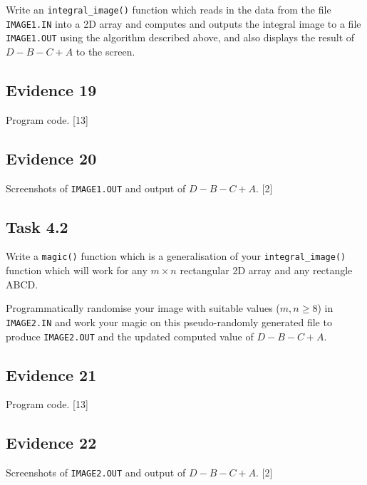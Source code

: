 Write an \texttt{integral\_image()} function which reads in the data
from the file \texttt{IMAGE1.IN} into a 2D array and computes and
outputs the integral image to a file \texttt{IMAGE1.OUT} using the
algorithm described above, and also displays the result of $D-B-C+A$
to the screen. 

\subsection*{Evidence 19}

Program code. \hfill{} {[}13{]}

\subsection*{Evidence 20}

Screenshots of \texttt{IMAGE1.OUT} and output of $D-B-C+A$. \hfill{}{[}2{]}

\subsection*{Task 4.2}

Write a \texttt{magic()} function which is a generalisation of your
\texttt{integral\_image()} function which will work for any $m\times n$
rectangular 2D array and any rectangle ABCD.

Programmatically randomise your image with suitable values ($m,n\geq8$)
in \texttt{IMAGE2.IN} and work your magic on this pseudo-randomly
generated file to produce \texttt{IMAGE2.OUT} and the updated computed
value of $D-B-C+A$. 

\subsection*{Evidence 21}

Program code. \hfill{}{[}13{]}

\subsection*{Evidence 22 }

Screenshots of \texttt{IMAGE2.OUT} and output of $D-B-C+A$. \hfill{}{[}2{]}